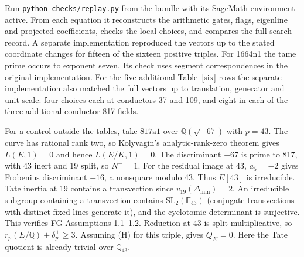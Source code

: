 \documentclass[11pt]{article}
\newcommand{\Q}{\mathbb Q}
\newcommand{\F}{\mathbb F}
\begin{document}
Run \texttt{python checks/replay.py} from the bundle with its SageMath environment active. From each equation it reconstructs the arithmetic gates, flags, eigenline and projected coefficients, checks the local choices, and compares the full search record. A separate implementation reproduced the vectors up to the stated coordinate changes for fifteen of the sixteen positive triples. For 1664n1 the tame prime occurs to exponent seven. Its check uses segment correspondences in the original implementation. For the five additional Table~\ref{six} rows the separate implementation also matched the full vectors up to translation, generator and unit scale: four choices each at conductors 37 and 109, and eight in each of the three additional conductor-817 fields.

For a control outside the tables, take $817\mathrm a1$ over $\Q(\sqrt{-67})$ with $p=43$. The curve has rational rank two, so Kolyvagin's analytic-rank-zero theorem \cite{Kol} gives $L(E,1)=0$ and hence $L(E/K,1)=0$. The discriminant $-67$ is prime to 817, with 43 inert and 19 split, so $N^-=1$. For the residual image at 43, $a_5=-2$ gives Frobenius discriminant $-16$, a nonsquare modulo 43. Thus $E[43]$ is irreducible. Tate inertia at 19 contains a transvection since $v_{19}(\Delta_{\min})=2$. An irreducible subgroup containing a transvection contains $\mathrm{SL}_2(\F_{43})$ (conjugate transvections with distinct fixed lines generate it), and the cyclotomic determinant is surjective. This verifies FG Assumptions 1.1--1.2. Reduction at 43 is split multiplicative, so $r_p(E/\Q)+\delta_p^+\ge3$. Assuming (H) for this triple, \cite[Theorem 1.3, proved as Theorem 3.4]{FG} gives $Q_K=0$. Here the Tate quotient is already trivial over $\Q_{43}$.
\end{document}
